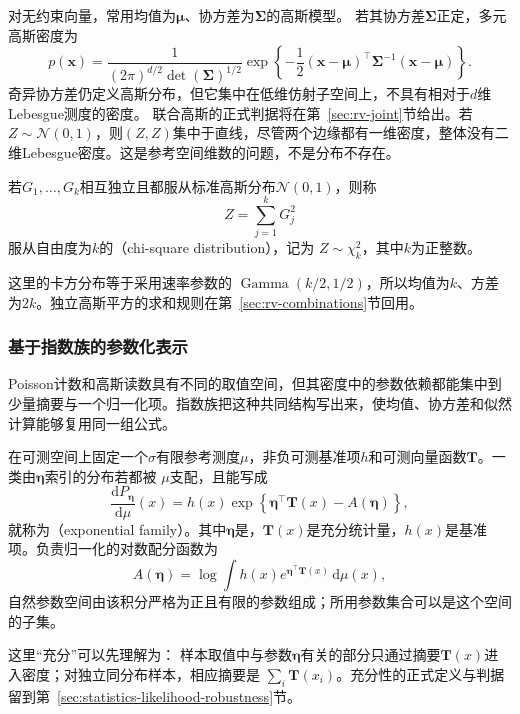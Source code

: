 对无约束向量，常用均值为\(\bm\mu\)、协方差为\(\bm\Sigma\)的高斯模型。
若其协方差\(\bm{\Sigma}\)正定，多元高斯密度为
\[
  p(\bm{x})
  =
  \frac{1}{(2\pi)^{d/2}\det(\bm{\Sigma})^{1/2}}
  \exp\left\{
    -\frac12
    (\bm{x}-\bm{\mu})^{\top}
    \bm{\Sigma}^{-1}
    (\bm{x}-\bm{\mu})
  \right\}.
\]
奇异协方差仍定义高斯分布，但它集中在低维仿射子空间上，不具有相对于\(d\)维Lebesgue测度的密度。
联合高斯的正式判据将在第~\ref{sec:rv-joint}节给出。若
\(Z\sim\mathcal N(0,1)\)，则\((Z,Z)\)集中于直线，尽管两个边缘都有一维密度，整体没有二维Lebesgue密度。这是参考空间维数的问题，不是分布不存在。
\begin{definition}[卡方分布]
  \label{def:probability-chi-square-distribution}
若\(G_1,\ldots,G_k\)相互独立且都服从标准高斯分布\(\mathcal N(0,1)\)，则称
\[
  Z=\sum_{j=1}^{k}G_j^2
\]
服从自由度为\(k\)的（chi-square distribution），记为
\(Z\sim\chi_k^2\)，其中\(k\)为正整数。
\end{definition}
这里的卡方分布等于采用速率参数的
\(\operatorname{Gamma}(k/2,1/2)\)，所以均值为\(k\)、方差为\(2k\)。独立高斯平方的求和规则在第~\ref{sec:rv-combinations}节回用。

\subsubsection{基于指数族的参数化表示}
Poisson计数和高斯读数具有不同的取值空间，但其密度中的参数依赖都能集中到少量摘要与一个归一化项。指数族把这种共同结构写出来，使均值、协方差和似然计算能够复用同一组公式。
\begin{definition}[指数族]
  \label{def:probability-exponential-family}
在可测空间上固定一个\(\sigma\)有限参考测度\(\mu\)，非负可测基准项\(h\)和可测向量函数\(\bm T\)。一类由\(\bm{\eta}\)索引的分布若都被
\(\mu\)支配，且能写成
\begin{equation}
  \frac{\mathrm{d}P_{\bm{\eta}}}{\mathrm{d}\mu}(x)
  =
  h(x)\exp\left\{
    \bm{\eta}^{\top}\bm{T}(x)-A(\bm{\eta})
  \right\},
  \label{eq:probability-exponential-family}
\end{equation}
就称为（exponential family）。其中\(\bm{\eta}\)是，\(\bm{T}(x)\)是充分统计量，\(h(x)\)是基准项。负责归一化的对数配分函数为
\[ A(\bm{\eta})
  =\log\int h(x)e^{\bm{\eta}^{\top}\bm{T}(x)}\,\mathrm{d}\mu(x), \]
自然参数空间由该积分严格为正且有限的参数组成；所用参数集合可以是这个空间的子集。
\end{definition}
这里“充分”可以先理解为：
样本取值中与参数\(\bm{\eta}\)有关的部分只通过摘要\(\bm{T}(x)\)进入密度；对独立同分布样本，相应摘要是
\(\sum_i\bm{T}(x_i)\)。充分性的正式定义与判据留到第~\ref{sec:statistics-likelihood-robustness}节。


